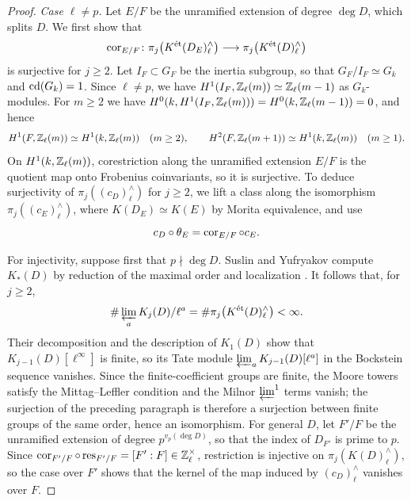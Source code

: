 \begin{proof}
\emph{Case $\ell\ne p$.}
Let $E/F$ be the unramified extension of degree $\deg D$, which splits $D$.
We first show that
\[
 \operatorname{cor}_{E/F}\colon\pi_j\bigl(K^{\mathrm{\acute et}}(D_E)^\wedge_\ell\bigr)\longrightarrow\pi_j\bigl(K^{\mathrm{\acute et}}(D)^\wedge_\ell\bigr)
\]
is surjective for $j\ge2$.
Let $I_F\subset G_F$ be the inertia subgroup, so that $G_F/I_F\simeq G_k$ and $\operatorname{cd}(G_k)=1$.
Since $\ell\ne p$, we have $H^1(I_F,\mathbb Z_\ell(m))\simeq\mathbb Z_\ell(m-1)$ as $G_k$-modules.
For $m\ge2$ we have $H^0(k,H^1(I_F,\mathbb Z_\ell(m)))=H^0(k,\mathbb Z_\ell(m-1))=0$, and hence
\[
 H^1(F,\mathbb Z_\ell(m))\simeq H^1(k,\mathbb Z_\ell(m))\quad(m\ge2),\qquad
 H^2(F,\mathbb Z_\ell(m+1))\simeq H^1(k,\mathbb Z_\ell(m))\quad(m\ge1).
\]
On $H^1(k,\mathbb Z_\ell(m))$, corestriction along the unramified extension $E/F$ is the quotient map onto Frobenius coinvariants, so it is surjective.
To deduce surjectivity of $\pi_j((c_D)^\wedge_\ell)$ for $j\ge2$, we lift a class along the isomorphism $\pi_j((c_E)^\wedge_\ell)$, where $K(D_E)\simeq K(E)$ by Morita equivalence, and use
\[
 c_D\circ\theta_E=\operatorname{cor}_{E/F}\circ c_E.
\]

For injectivity, suppose first that $p\nmid\deg D$.
Suslin and Yufryakov compute $K_*(D)$ by reduction of the maximal order and localization \cite[Lemma 2 and Theorem 3]{SuslinYufryakov}.
It follows that, for $j\ge2$,
\[
 \#\varprojlim_aK_j(D)/\ell^a=\#\pi_j\bigl(K^{\mathrm{\acute et}}(D)^\wedge_\ell\bigr)<\infty.
\]
Their decomposition and the description of $K_1(D)$ show that $K_{j-1}(D)[\ell^\infty]$ is finite, so its Tate module $\varprojlim_aK_{j-1}(D)[\ell^a]$ in the Bockstein sequence vanishes.
Since the finite-coefficient groups are finite, the Moore towers satisfy the Mittag--Leffler condition and the Milnor $\varprojlim^1$ terms vanish; the surjection of the preceding paragraph is therefore a surjection between finite groups of the same order, hence an isomorphism.
For general $D$, let $F'/F$ be the unramified extension of degree $p^{v_p(\deg D)}$, so that the index of $D_{F'}$ is prime to $p$.
Since $\operatorname{cor}_{F'/F}\circ\operatorname{res}_{F'/F}=[F':F]\in\mathbb Z_\ell^\times$, restriction is injective on $\pi_j(K(D)^\wedge_\ell)$, so the case over $F'$ shows that the kernel of the map induced by $(c_D)^\wedge_\ell$ vanishes over $F$.


\end{proof}
